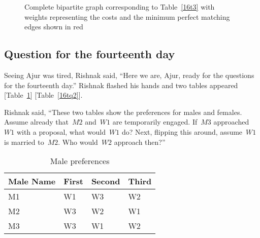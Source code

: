 \begin{figure}
\begin{center}

\caption{Complete bipartite graph corresponding to Table~\ref{16t3} with weights representing the costs and the minimum perfect matching edges shown in red}\label{16g3}
\end{center}
\end{figure}

\begin{newpage}
\end{newpage}

\subsection*{Question for the fourteenth day}
Seeing Ajur was tired, Rishnak said, ``Here we are, Ajur, ready for the questions for the fourteenth day.'' Rishnak flashed his hands and two tables appeared [Table~\ref{16tq1}] [Table~\ref{16tq2}].

Rishnak said, ``These two tables show the preferences for males and females. Assume already that~$M2$ and~$W1$ are temporarily engaged. If~$M3$ approached~$W1$ with a proposal, what would~$W1$ do? Next, flipping this around, assume~$W1$ is married to~$M2$. Who would~$W2$ approach then?''

\begin{table}
\begin{center}
\begin{tabular}{ |p{3cm}||p{1.5cm}||p{1.5cm} || p{1.5cm}|| }
 \hline
 \hline
 Male Name & First&Second&Third\\
 \hline
 M1  & W1   &W3&W2\\
 M2&W3&W2&W1\\
M3&W3&W1&W2\\
 
 
 \hline
\end{tabular}
\caption{Male preferences}\label{16tq1}
\end{center}
\end{table}

